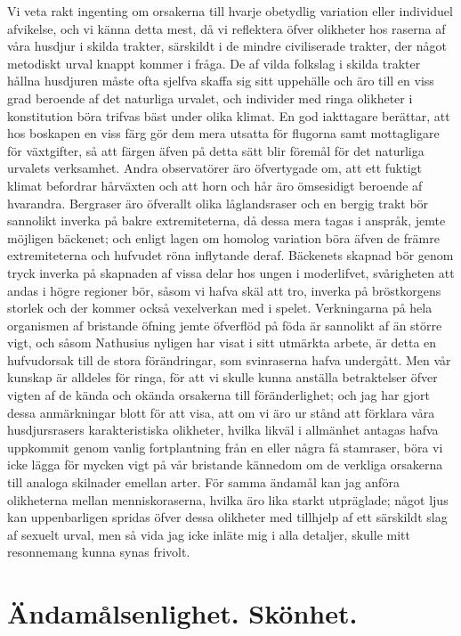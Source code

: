 Vi veta rakt ingenting om orsakerna till hvarje obetydlig variation eller individuel afvikelse, och vi känna detta mest, då vi reflektera öfver olikheter hos raserna af våra husdjur i skilda trakter, särskildt i de mindre civiliserade trakter, der något metodiskt urval knappt kommer i fråga. De af vilda folkslag i skilda trakter hållna husdjuren måste ofta sjelfva skaffa sig sitt uppehälle och äro till en viss grad beroende af det naturliga urvalet, och individer med ringa olikheter i konstitution böra trifvas bäst under olika klimat. En god iakttagare berättar, att hos boskapen en viss färg gör dem mera utsatta för flugorna samt mottagligare för växtgifter, så att färgen äfven på detta sätt blir föremål för det naturliga urvalets verksamhet. Andra observatörer äro öfvertygade om, att ett fuktigt klimat befordrar hårväxten och att horn och hår äro ömsesidigt beroende af hvarandra. Bergraser äro öfverallt olika låglandsraser och en bergig trakt bör sannolikt inverka på bakre extremiteterna, då dessa mera tagas i anspråk, jemte möjligen bäckenet; och enligt lagen om homolog variation böra äfven de främre extremiteterna och hufvudet röna inflytande deraf. Bäckenets skapnad bör genom tryck inverka på skapnaden af vissa delar hos ungen i moderlifvet, svårigheten att andas i högre regioner bör, såsom vi hafva skäl att tro, inverka på bröstkorgens storlek och der kommer också vexelverkan med i spelet. Verkningarna på hela organismen af bristande öfning jemte öfverflöd på föda är sannolikt af än större vigt, och såsom Nathusius nyligen har visat i sitt utmärkta arbete, är detta en hufvudorsak till de stora förändringar, som svinraserna hafva undergått. Men vår kunskap är alldeles för ringa, för att vi skulle kunna anställa betraktelser öfver vigten af de kända och okända orsakerna till föränderlighet; och jag har gjort dessa anmärkningar blott för att visa, att om vi äro ur stånd att förklara våra husdjursrasers karakteristiska olikheter, hvilka likväl i allmänhet antagas hafva uppkommit genom vanlig fortplantning från en eller några få stamraser, böra vi icke lägga för mycken vigt på vår bristande kännedom om de verkliga orsakerna till analoga skilnader emellan arter. För samma ändamål kan jag anföra olikheterna mellan menniskoraserna, hvilka äro lika starkt utpräglade; något ljus kan uppenbarligen spridas öfver dessa olikheter med tillhjelp af ett särskildt slag af sexuelt urval, men så vida jag icke inläte mig i alla detaljer, skulle mitt resonnemang kunna synas frivolt.



\section{Ändamålsenlighet. Skönhet.}

